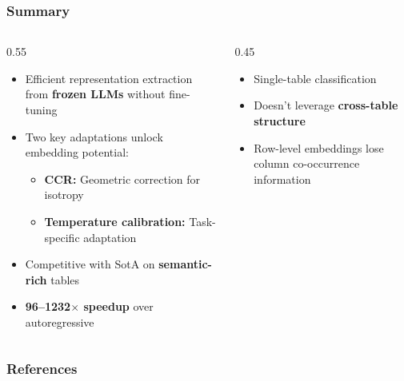 \documentclass[
	10pt, %
	aspectratio=169, %
]{beamer}
\begin{document}
\begin{frame}
	\frametitle{Summary}
	\vspace{1em}
	\begin{columns}[T]
		\begin{column}{0.55\textwidth}
			\begin{itemize}
				\item Efficient representation extraction from \textbf{frozen LLMs} without fine-tuning
				\item Two key adaptations unlock embedding potential:
				      \begin{itemize}
					      \item \textbf{CCR:} Geometric correction for isotropy
					      \item \textbf{Temperature calibration:} Task-specific adaptation
				      \end{itemize}
				\item Competitive with SotA on \textbf{semantic-rich} tables
				\item \textbf{96--1232$\times$ speedup} over autoregressive
			\end{itemize}
		\end{column}
		\begin{column}{0.45\textwidth}
			\begin{itemize}
				\item Single-table classification
				\item Doesn't leverage \textbf{cross-table structure}
				\item Row-level embeddings lose column co-occurrence information
			\end{itemize}
		\end{column}
	\end{columns}
\end{frame}

\begin{frame}[allowframebreaks]
	\frametitle{References}
	\printbibliography
\end{frame}
\end{document}
